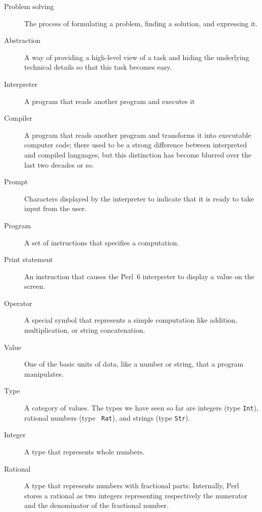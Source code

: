 \begin{description}

\item[Problem solving]  The process of formulating a problem, finding
a solution, and expressing it.

\item[Abstraction] A way of providing a high-level view 
of a task and hiding the underlying technical details so 
that this task becomes easy.

\item[Interpreter]  A program that reads another program and executes it

\item[Compiler]  A program that reads another program and 
transforms it into executable computer code; there used to be 
a strong difference between interpreted and compiled languages, 
but this distinction has become blurred over the last 
two decades or so.

\item[Prompt] Characters displayed by the interpreter to indicate
that it is ready to take input from the user.

\item[Program] A set of instructions that specifies a computation.

\item[Print statement]  An instruction that causes the Perl~6
interpreter to display a value on the screen.

\item[Operator]  A special symbol that represents a simple computation like
addition, multiplication, or string concatenation.

\item[Value]  One of the basic units of data, like a number or string, 
that a program manipulates.

\item[Type] A category of values.  The types we have seen so far
are integers (type {\tt Int}), rational numbers (type {\tt
Rat}), and strings (type {\tt Str}).

\item[Integer] A type that represents whole numbers.

\item[Rational] A type that represents numbers with fractional
parts. Internally, Perl stores a rational as two integers 
representing respectively the numerator and the denominator 
of the fractional number.


\end{description}
